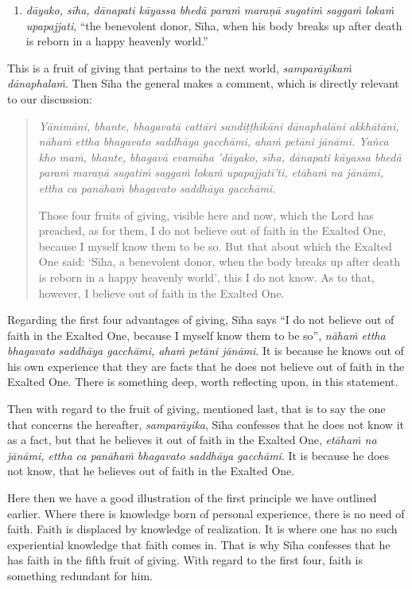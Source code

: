 \begin{enumerate}
\def\labelenumi{\arabic{enumi}.}
\setcounter{enumi}{4}
\tightlist
\item
  \emph{dāyako, sīha, dānapati kāyassa bhedā paraṁ maraṇā sugatiṁ saggaṁ lokaṁ upapajjati}, ``the benevolent donor, Sīha, when his body breaks up after death is reborn in a happy heavenly world.''
\end{enumerate}

This is a fruit of giving that pertains to the next world, \emph{samparāyikaṁ dānaphalaṁ}. Then Sīha the general makes a comment, which is directly relevant to our discussion:

\begin{quote}
\emph{Yānimāni, bhante, bhagavatā cattāri sandiṭṭhikāni dānaphalāni akkhātāni, nāhaṁ ettha bhagavato saddhāya gacchāmi, ahaṁ petāni jānāmi. Yañca kho maṁ, bhante, bhagavā evamāha 'dāyako, sīha, dānapati kāyassa bhedā paraṁ maraṇā sugatiṁ saggaṁ lokaṁ upapajjatī'ti, etāhaṁ na jānāmi, ettha ca panāhaṁ bhagavato saddhāya gacchāmi}.

Those four fruits of giving, visible here and now, which the Lord has preached, as for them, I do not believe out of faith in the Exalted One, because I myself know them to be so. But that about which the Exalted One said: `Sīha, a benevolent donor, when the body breaks up after death is reborn in a happy heavenly world', this I do not know. As to that, however, I believe out of faith in the Exalted One.
\end{quote}

Regarding the first four advantages of giving, Sīha says ``I do not believe out of faith in the Exalted One, because I myself know them to be so'', \emph{nāhaṁ ettha bhagavato saddhāya gacchāmi, ahaṁ petāni jānāmi}. It is because he knows out of his own experience that they are facts that he does not believe out of faith in the Exalted One. There is something deep, worth reflecting upon, in this statement.

Then with regard to the fruit of giving, mentioned last, that is to say the one that concerns the hereafter, \emph{samparāyika}, Sīha confesses that he does not know it as a fact, but that he believes it out of faith in the Exalted One, \emph{etāhaṁ na jānāmi, ettha ca panāhaṁ bhagavato saddhāya gacchāmi}. It is because he does not know, that he believes out of faith in the Exalted One.

Here then we have a good illustration of the first principle we have outlined earlier. Where there is knowledge born of personal experience, there is no need of faith. Faith is displaced by knowledge of realization. It is where one has no such experiential knowledge that faith comes in. That is why Sīha confesses that he has faith in the fifth fruit of giving. With regard to the first four, faith is something redundant for him.

